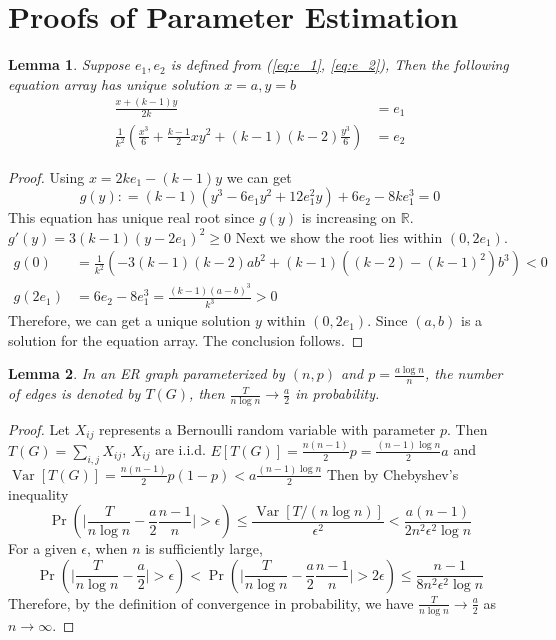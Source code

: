 \documentclass{ctexart}
\newtheorem{lemma}{Lemma}
\DeclareMathOperator{\Var}{Var}
\begin{document}
\section{Proofs of Parameter Estimation}
	\begin{lemma}
		Suppose $e_1, e_2$ is defined from (\ref{eq:e_1}, \ref{eq:e_2}), Then the following equation array has unique solution $x=a, y=b$
		\begin{align}
	\frac{x+(k-1)y}{2k} & = e_1 \\
\frac{1}{k^2}
\left(\frac{x^3}{6} + \frac{k-1}{2}xy^2 + (k-1)(k-2)\frac{y^3}{6}\right) & = e_2	
		\end{align}
	\end{lemma}
\begin{proof}
	Using $x=2ke_1 - (k-1)y$ we can get
	\begin{equation}
	g(y): = (k-1)(y^3 - 6 e_1 y^2 + 12 e_1^2 y) + 6 e_2 - 8 k e_1^3 = 0
	\end{equation}
	This equation has unique real root since $g(y)$ is increasing on $\mathbb{R}$. $g'(y) = 3(k-1)(y-2e_1)^2 \geq 0 $
	Next we show the root lies within $(0, 2e_1)$.
	\begin{align*}
	g(0) &= \frac{1}{k^2}\left(-3(k-1)(k-2)ab^2 + (k-1)((k-2)-(k-1)^2)b^3\right) < 0 \\
	g(2e_1) &= 6e_2 - 8e_1^3 = \frac{(k-1)(a-b)^3}{k^3} > 0
	\end{align*}
	Therefore, we can get a unique solution $y$ within $(0, 2e_1)$. Since $(a,b)$ is a solution for the equation array. The conclusion follows.
	
\end{proof}
	\begin{lemma}\label{lem:ERT}
	In an ER graph parameterized by $(n,p)$ and $p=\frac{a\log n}{n}$, the number of edges is denoted by $T(G)$, then
	$\frac{T}{n \log n} \to \frac{a}{2}$ in probability.
	\end{lemma}
\begin{proof}
	Let $X_{ij}$ represents a Bernoulli random variable with parameter $p$. Then $T(G) = \sum_{i,j} X_{ij}$, $X_{ij}$ are i.i.d.
	$E[T(G)] = \frac{n(n-1)}{2}p = \frac{(n-1)\log n}{2}a$ and $\Var[T(G)] = \frac{n(n-1)}{2} p(1-p) < a\frac{(n-1)\log n}{2}$
	Then by Chebyshev's inequality
	$$
	\Pr(\Big|\frac{T}{n \log n } - \frac{a}{2} \frac{n-1}{n}\Big| > \epsilon) \leq \frac{\Var[T /(n \log n )]}{\epsilon^2} < \frac{a(n-1)}{2n^2\epsilon^2\log n}
	$$
	For a given $\epsilon$, when $n$ is sufficiently large,
	$$
	\Pr(\Big|\frac{T}{n \log n } - \frac{a}{2} \Big| > \epsilon) < \Pr(\Big|\frac{T}{n \log n } - \frac{a}{2} \frac{n-1}{n}\Big| > 2\epsilon)
	\leq \frac{n-1}{8n^2 \epsilon^2 \log n}
	$$
	Therefore, by the definition of convergence in probability, we have $\frac{T}{n \log n} \to \frac{a}{2}$ as $n\to \infty$.
\end{proof}
\end{document}
